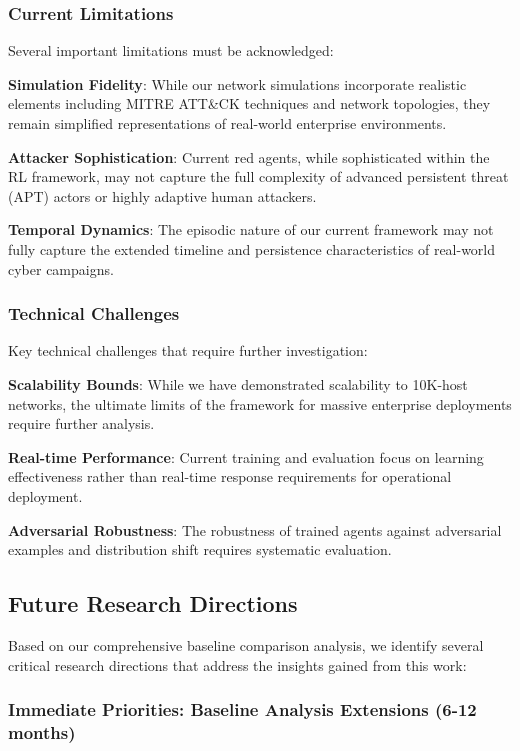 \documentclass[12pt,twoside]{article}
\begin{document}
\subsubsection{Current Limitations}
Several important limitations must be acknowledged:

\textbf{Simulation Fidelity}: While our network simulations incorporate realistic elements including MITRE ATT\&CK techniques and network topologies, they remain simplified representations of real-world enterprise environments.

\textbf{Attacker Sophistication}: Current red agents, while sophisticated within the RL framework, may not capture the full complexity of advanced persistent threat (APT) actors or highly adaptive human attackers.

\textbf{Temporal Dynamics}: The episodic nature of our current framework may not fully capture the extended timeline and persistence characteristics of real-world cyber campaigns.

\subsubsection{Technical Challenges}
Key technical challenges that require further investigation:

\textbf{Scalability Bounds}: While we have demonstrated scalability to 10K-host networks, the ultimate limits of the framework for massive enterprise deployments require further analysis.

\textbf{Real-time Performance}: Current training and evaluation focus on learning effectiveness rather than real-time response requirements for operational deployment.

\textbf{Adversarial Robustness}: The robustness of trained agents against adversarial examples and distribution shift requires systematic evaluation.

\subsection{Future Research Directions}

Based on our comprehensive baseline comparison analysis, we identify several critical research directions that address the insights gained from this work:

\subsubsection{Immediate Priorities: Baseline Analysis Extensions (6-12 months)}
\end{document}
